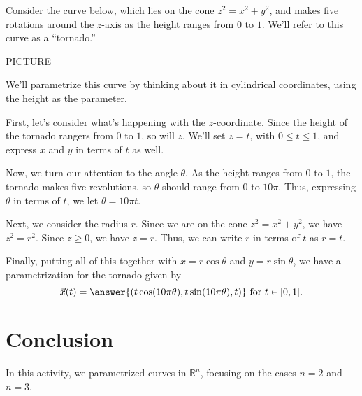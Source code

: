 \documentclass{ximera}
\begin{document}
\begin{example}
Consider the curve below, which lies on the cone $z^2 = x^2 + y^2$, and makes five rotations around the $z$-axis as the height ranges from $0$ to $1$. We'll refer to this curve as a ``tornado.''

PICTURE

We'll parametrize this curve by thinking about it in cylindrical coordinates, using the height as the parameter.

First, let's consider what's happening with the $z$-coordinate. Since the height of the tornado rangers from $0$ to $1$, so will $z$. We'll set $z = t$, with $0\leq t\leq 1$, and express $x$ and $y$ in terms of $t$ as well.

Now, we turn our attention to the angle $\theta$. As the height ranges from $0$ to $1$, the tornado makes five revolutions, so $\theta$ should range from $0$ to $10\pi$. Thus, expressing $\theta$ in terms of $t$, we let $\theta = 10\pi t$.

Next, we consider the radius $r$. Since we are on the cone $z^2 = x^2 + y^2$, we have $z^2 = r^2$. Since $z\geq 0$, we have $z = r$. Thus, we can write $r$ in terms of $t$ as $r = t$.

Finally, putting all of this together with $x = r\cos\theta$ and $y = r\sin\theta$, we have a parametrization for the tornado given by
\[
\vec{x}(t) = \answer{(t\cos(10\pi\theta), t\sin(10\pi\theta), t)} \textrm{ for } t\in [0,1].
\]
\end{example}

\section{Conclusion}

In this activity, we parametrized curves in $\mathbb{R}^n$, focusing on the cases $n=2$ and $n=3$.
\end{document}
